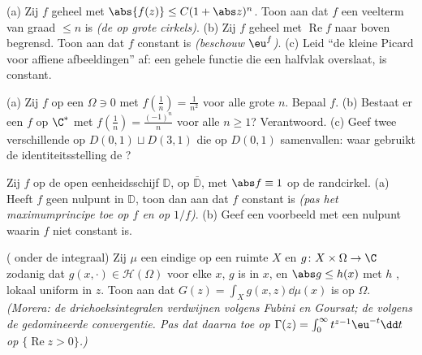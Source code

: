 \begin{exercise}[$\star\star$]\label{exo:b3:holomorphic:4}
(a) Zij $f$ geheel met $\abs{f(z)} \leq C(1 + \abs z)^{n}$. Toon
aan dat $f$ een veelterm van graad $\leq n$ is \emph{(de
 op grote cirkels)}.
(b) Zij $f$ geheel met $\operatorname{Re}f$ naar boven begrensd.
Toon aan dat $f$ constant is \emph{(beschouw $\eu^{f}$)}.
(c) Leid ``de kleine Picard voor affiene afbeeldingen'' af: een
gehele functie die een halfvlak overslaat, is constant.
\end{exercise}

\begin{exercise}[$\star\star$]\label{exo:b3:holomorphic:5}
(a) Zij $f$  op een  $\Omega \ni 0$ met
$f(\frac1n) = \frac1{n^2}$ voor alle grote $n$. Bepaal $f$.
(b) Bestaat er een  $f$ op $\C^*$ met $f(\frac1n) =
\frac{(-1)^n}{n}$ voor alle $n \geq 1$? Verantwoord.
(c) Geef twee verschillende  op $D(0,1)\sqcup
D(3,1)$ die op $D(0,1)$ samenvallen: waar gebruikt de
identiteitsstelling de ?
\end{exercise}

\begin{exercise}[$\star\star$]\label{exo:b3:holomorphic:6}
Zij $f$  op de open eenheidsschijf $\mathbb D$, 
op $\bar{\mathbb D}$, met $\abs f \equiv 1$ op de randcirkel.
(a) Heeft $f$ geen nulpunt in $\mathbb D$, toon dan aan dat $f$
constant is \emph{(pas het maximumprincipe toe op $f$ en op
$1/f$)}.
(b) Geef een voorbeeld met een nulpunt waarin $f$ niet constant
is.
\end{exercise}

\begin{exercise}[$\star\star$]\label{exo:b3:holomorphic:7}
( onder de integraal) Zij $\mu$ een eindige  op een
ruimte $X$ en $g \colon X\times\Omega \to \C$ zodanig dat $g(x,
\cdot) \in \mathcal H(\Omega)$ voor elke $x$, $g$  is in
$x$, en $\abs g \leq h(x)$ met $h$ , lokaal uniform
in $z$. Toon aan dat $G(z) = \int_Xg(x, z)\dd\mu(x)$  is
op $\Omega$. \emph{(Morera: de driehoeksintegralen verdwijnen
volgens Fubini en Goursat; de  volgens de gedomineerde
convergentie. Pas dat daarna toe op $\Gamma(z) = \int_0^\infty
t^{z-1}\eu^{-t}\dd t$ op $\{\operatorname{Re}z > 0\}$.)}
\end{exercise}

